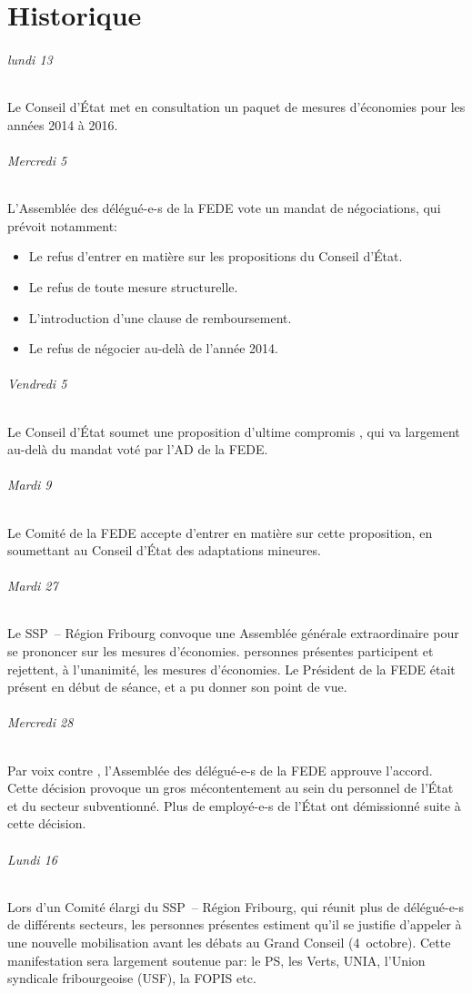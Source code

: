 
\chapter{Historique}%
\subparagraph{lundi 13}%
Le Conseil d'État met en consultation un paquet de mesures d'économies pour les années 2014 à 2016.

\subparagraph{Mercredi 5}%
L'Assemblée des délégué-e-s de la FEDE vote un mandat de négociations, qui prévoit notamment:
\begin{itemize}
	\item Le refus d'entrer en matière sur les propositions du Conseil d'État.
	\item Le refus de toute mesure structurelle.
	\item L'introduction d'une clause de remboursement.
	\item Le refus de négocier au-delà de l'année 2014.
\end{itemize}

\subparagraph{Vendredi 5}%
Le Conseil d'État soumet une proposition d'\og ultime compromis \fg, qui va largement au-delà du mandat voté par l'AD de la FEDE.

\subparagraph{Mardi 9}%
Le Comité de la FEDE accepte d'entrer en matière sur cette proposition, en soumettant au Conseil d'État des adaptations mineures.

\subparagraph{Mardi 27}%
Le SSP~– Région Fribourg convoque une Assemblée générale extraordinaire pour se prononcer sur les mesures d'économies.
 personnes présentes participent et rejettent, à l'unanimité, les mesures d'économies.
Le Président de la FEDE était présent en début de séance, et a pu donner son point de vue.

\subparagraph{Mercredi 28}%
Par  voix contre , l'Assemblée des délégué-e-s de la FEDE approuve l'accord.
Cette décision provoque un gros mécontentement au sein du personnel de l'État et du secteur subventionné.
Plus de  employé-e-s de l'État ont démissionné suite à cette décision.

\subparagraph{Lundi 16}%
Lors d'un \og Comité élargi \fg du SSP~– Région Fribourg, qui réunit plus de  délégué-e-s de différents secteurs,
les personnes présentes estiment qu'il se justifie d'appeler à une nouvelle mobilisation avant les débats au Grand Conseil (4~octobre).
Cette manifestation sera largement soutenue par: le PS, les Verts, UNIA, l'Union syndicale fribourgeoise (USF), la FOPIS etc.

